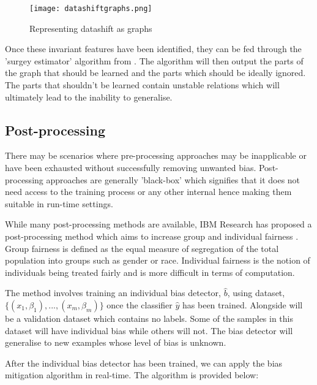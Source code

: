 \begin{figure}[H]
    \texttt{[image: datashiftgraphs.png]}
    \centering
    \caption{Representing datashift as graphs \cite{subbaswamy2019preventing}}
    \label{fig:DAG}
\end{figure}

Once these invariant features have been identified, they can be fed through the 'surgey estimator' algorithm from \cite{subbaswamy2019preventing}.
The algorithm will then output the parts of the graph that should be learned and the parts which should be ideally ignored.
The parts that shouldn't be learned contain unstable relations which will ultimately lead to the inability to generalise.

\subsection{Post-processing}
There may be scenarios where pre-processing approaches may be inapplicable or have been exhausted without successfully removing unwanted bias.
Post-processing approaches are generally 'black-box' which signifies that it does not need access to the training process or any other internal hence making them suitable in run-time settings.

While many post-processing methods are available, IBM Research has proposed a post-processing method which aims to increase group and individual fairness \cite{lohia2018bias}.
Group fairness is defined as the equal measure of segregation of the total population into groups such as gender or race. 
Individual fairness is the notion of individuals being treated fairly and is more difficult in terms of computation.

The method involves training an individual bias detector, $\hat{b}$, using dataset, \\ 
$\{(x_1,\beta_1), ..., (x_m,\beta_m)\}$ once the classifier $\hat{y}$ has been trained.
Alongside will be a validation dataset which contains no labels.
Some of the samples in this dataset will have individual bias while others will not.
The bias detector will generalise to new examples whose level of bias is unknown.

After the individual bias detector has been trained, we can apply the bias mitigation algorithm \cite{lohia2018bias} in real-time. 
The algorithm is provided below:  


